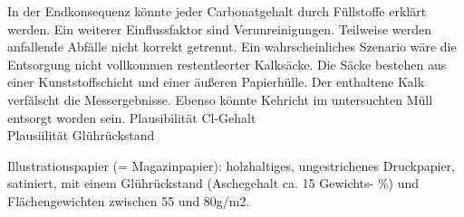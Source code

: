 In der Endkonsequenz könnte jeder Carbonatgehalt durch Füllstoffe erklärt werden. Ein weiterer Einflussfaktor sind Verunreinigungen. Teilweise werden anfallende Abfälle nicht korrekt getrennt. Ein wahrscheinliches Szenario wäre die Entsorgung nicht vollkommen restentleerter Kalksäcke. Die Säcke bestehen aus einer Kunststoffschicht und einer äußeren Papierhülle. Der enthaltene Kalk verfälscht die Messergebnisse. Ebenso könnte Kehricht im untersuchten Müll entsorgt worden sein.
\cite{domininghausKunststoffeUndIhre1998}
\cite{roempppap}
Plausibilität Cl-Gehalt\\

Plausiilität Glührückstand

Illustrationspapier (= Magazinpapier): holzhaltiges, ungestrichenes Druckpapier, satiniert, mit einem Glührückstand (Aschegehalt ca. 15 Gewichts- \%) und Flächengewichten zwischen 55 und 80g/m2. 

%

